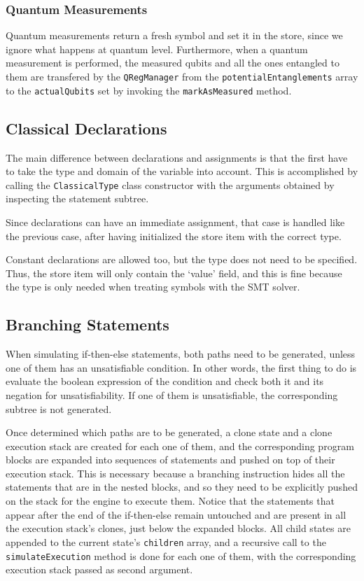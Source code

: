 \documentclass[12pt,a4paper]{report}
\theoremstyle{definition}
\theoremstyle{definition}
\theoremstyle{definition}
\begin{document}
\pagebreak

\subsubsection{Quantum Measurements}
Quantum measurements return a fresh symbol and set it in the store, since we ignore what happens at quantum level. Furthermore, when a quantum measurement is performed, the measured qubits and all the ones entangled to them are transfered by the \texttt{QRegManager} from the \texttt{potentialEntanglements} array to the \texttt{actualQubits} set by invoking the \texttt{markAsMeasured} method.

\subsection{Classical Declarations}
The main difference between declarations and assignments is that the first have to take the type and domain of the variable into account. This is accomplished by calling the \texttt{ClassicalType} class constructor with the arguments obtained by inspecting the statement subtree.

Since declarations can have an immediate assignment, that case is handled like the previous case, after having initialized the store item with the correct type.

Constant declarations are allowed too, but the type does not need to be specified. Thus, the store item will only contain the `value' field, and this is fine because the type is only needed when treating symbols with the SMT solver.

\subsection{Branching Statements}
When simulating if-then-else statements, both paths need to be generated, unless one of them has an unsatisfiable condition. In other words, the first thing to do is evaluate the boolean expression of the condition and check both it and its negation for unsatisfiability. If one of them is unsatisfiable, the corresponding subtree is not generated.

Once determined which paths are to be generated, a clone state and a clone execution stack are created for each one of them, and the corresponding program blocks are expanded into sequences of statements and pushed on top of their execution stack. This is necessary because a branching instruction hides all the statements that are in the nested blocks, and so they need to be explicitly pushed on the stack for the engine to execute them. Notice that the statements that appear after the end of the if-then-else remain untouched and are present in all the execution stack's clones, just below the expanded blocks.
All child states are appended to the current state's \texttt{children} array, and a recursive call to the \texttt{simulateExecution} method is done for each one of them, with the corresponding execution stack passed as second argument.
\end{document}
